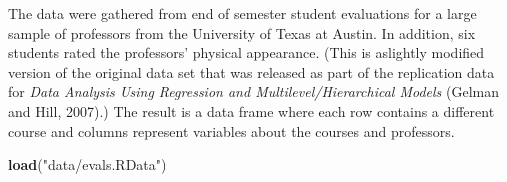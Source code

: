 \documentclass[]{book}
\newenvironment{Shaded}{\begin{snugshade}}{\end{snugshade}}
\newcommand{\KeywordTok}[1]{\textcolor[rgb]{0.13,0.29,0.53}{\textbf{{#1}}}}
\newcommand{\StringTok}[1]{\textcolor[rgb]{0.31,0.60,0.02}{{#1}}}
\newcommand{\NormalTok}[1]{{#1}}
\theoremstyle{definition}
\theoremstyle{definition}
\theoremstyle{remark}
\begin{document}
The data were gathered from end of semester student evaluations for a
large sample of professors from the University of Texas at Austin. In
addition, six students rated the professors' physical appearance. (This
is aslightly modified version of the original data set that was released
as part of the replication data for \emph{Data Analysis Using Regression
and Multilevel/Hierarchical Models} (Gelman and Hill, 2007).) The result
is a data frame where each row contains a different course and columns
represent variables about the courses and professors.

\begin{Shaded}
\begin{Highlighting}[]
\KeywordTok{load}\NormalTok{(}\StringTok{"data/evals.RData"}\NormalTok{)}
\end{Highlighting}
\end{Shaded}
\end{document}
